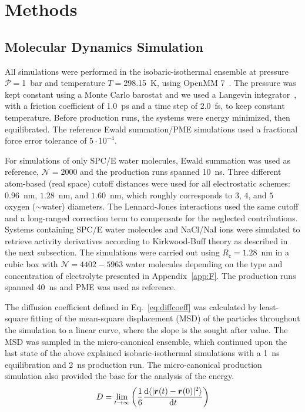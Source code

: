 \documentclass[
journal=jctcce,
manuscript=letter]{achemso}
\begin{document}
\section{Methods}
\subsection{Molecular Dynamics Simulation}
All simulations were performed in the isobaric-isothermal ensemble at pressure $\mathcal{P}=$1~bar and temperature $T=$298.15~K, using OpenMM 7~\cite{Eastman2017}. The pressure was kept constant using a Monte Carlo barostat\cite{qvist2004} and we used a Langevin integrator~\cite{Sivak2014}, with a friction coefficient of 1.0~ps and a time step of 2.0~fs, to keep constant temperature. Before production runs, the systems were energy minimized, then equilibrated. The reference Ewald summation/PME simulations used a fractional force error tolerance of $5\cdot 10^{-4}$. 

For simulations of only SPC/E water molecules, Ewald summation was used as reference, $\mathcal{N}=2000$ and the production runs spanned 10~ns. Three different atom-based (real space) cutoff distances were used for all electrostatic schemes: $0.96$~nm, $1.28$~nm, and $1.60$~nm, which roughly corresponds to $3$, $4$, and $5$ oxygen ($\sim$water) diameters. The Lennard-Jones interactions used the same cutoff and a long-ranged correction term to compensate for the neglected contributions\cite{Shirts2007Accurate}.
Systems containing SPC/E water molecules and NaCl/NaI ions were simulated to retrieve activity derivatives according to Kirkwood-Buff theory as described in the next subsection. The simulations were carried out using $R_c=1.28$~nm in a cubic box with $\mathcal{N}=4402-5963$ water molecules depending on the type and concentration of electrolyte presented in Appendix~\ref{app:F}. The production runs spanned 40~ns and PME was used as reference. 

The diffusion coefficient defined in Eq.~\ref{eq:diffcoeff} was calculated by least-square fitting of the mean-square displacement (MSD) of the particles throughout the simulation to a linear curve, where the slope is the sought after value. The MSD was sampled in the micro-canonical ensemble, which continued upon the last state of the above explained isobaric-isothermal simulations with a 1~ns equilibration and 2~ns production run. The micro-canonical production simulation also provided the base for the analysis of the energy.
\begin{equation}\label{eq:diffcoeff}
D = \lim_{t\to\infty}\left(\frac{1}{6}\frac{{\text d}\langle | \boldsymbol{r}(t)-\boldsymbol{r}(0) |^2 \rangle}{{\text d}t} \right)
\end{equation}
\end{document}
